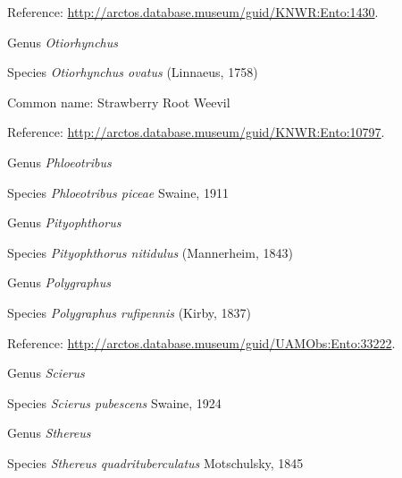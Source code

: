 \documentclass[9pt, article]{memoir}
\begin{document}
\begin{multicols}{2}
Reference: 
\url{http://arctos.database.museum/guid/KNWR:Ento:1430}.

\vspace{6pt}\noindent\hspace{30pt}Genus \textit{Otiorhynchus}


\vspace{6pt}\noindent\hspace{36pt}Species \textit{Otiorhynchus ovatus} (Linnaeus, 1758)


Common name: Strawberry Root Weevil

Reference: 
\url{http://arctos.database.museum/guid/KNWR:Ento:10797}.

\vspace{6pt}\noindent\hspace{30pt}Genus \textit{Phloeotribus}


\vspace{6pt}\noindent\hspace{36pt}Species \textit{Phloeotribus piceae} Swaine, 1911


\vspace{6pt}\noindent\hspace{30pt}Genus \textit{Pityophthorus}


\vspace{6pt}\noindent\hspace{36pt}Species \textit{Pityophthorus nitidulus} (Mannerheim, 1843)


\vspace{6pt}\noindent\hspace{30pt}Genus \textit{Polygraphus}


\vspace{6pt}\noindent\hspace{36pt}Species \textit{Polygraphus rufipennis} (Kirby, 1837)


Reference: 
\url{http://arctos.database.museum/guid/UAMObs:Ento:33222}.

\vspace{6pt}\noindent\hspace{30pt}Genus \textit{Scierus}


\vspace{6pt}\noindent\hspace{36pt}Species \textit{Scierus pubescens} Swaine, 1924


\vspace{6pt}\noindent\hspace{30pt}Genus \textit{Sthereus}


\vspace{6pt}\noindent\hspace{36pt}Species \textit{Sthereus quadrituberculatus} Motschulsky, 1845



\end{multicols}
\end{document}
